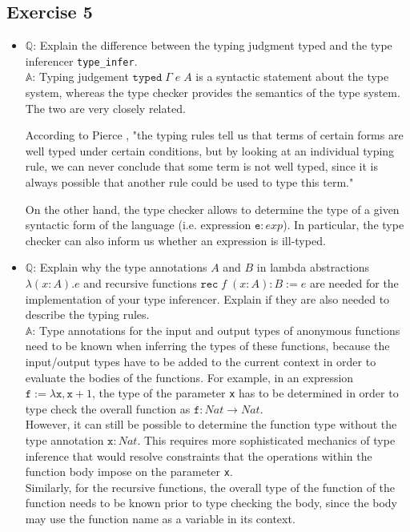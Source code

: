 \documentclass{article}
\newcommand{\tt}[1]{\texttt{#1}}
\begin{document}
\subsection{Exercise 5}
\begin{itemize}
    \item $\mathbb{Q}$: Explain the difference between the typing judgment typed and the type inferencer \texttt{type\_infer}.
    \\
    
    $\mathbb{A}$: Typing judgement $\texttt{typed} \; \Gamma \; e \; A$ is a syntactic statement about the type system, whereas the type checker provides the semantics of the type system. The two are very closely related.

    According to Pierce \cite{Pierce2002TypesAP}, "the typing rules tell us that terms of certain forms are well typed under certain conditions, but by looking at an individual typing rule, we can never conclude that some term is not well typed, since it is always possible that another rule could be used to type this term."

    On the other hand, the type checker allows to determine the type of a given syntactic form of the language (i.e. expression ${\tt{e}} : exp$). In particular, the type checker can also inform us whether an expression is ill-typed.
    
    \item $\mathbb{Q}$: Explain why the type annotations $A$ and $B$ in lambda abstractions $\lambda (x : A). e$ and recursive functions $\texttt{rec}  \; f \; (x : A) : B := e$ are needed for the implementation of your type inferencer. Explain if they are also needed to describe the typing rules.
    \\
    
    $\mathbb{A}$: Type annotations for the input and output types of anonymous functions need to be known when inferring the types of these functions, because the input/output types have to be added to the current context in order to evaluate the bodies of the functions. For example, in an expression ${\tt{f}} := \lambda {\tt{x}}, {\tt{x}} + 1$, the type of the parameter {\tt{x}} has to be determined in order to type check the overall function as ${\tt{f}} : Nat \to Nat$. \\
    
    However, it can still be possible to determine the function type without the type annotation ${\tt{x}} : Nat$. This requires more sophisticated mechanics of type inference that would resolve constraints that the operations within the function body impose on the parameter {\tt{x}}. \\

    Similarly, for the recursive functions, the overall type of the function of the function needs to be known prior to type checking the body, since the body may use the function name as a variable in its context. \\
    
\end{itemize}
\end{document}
